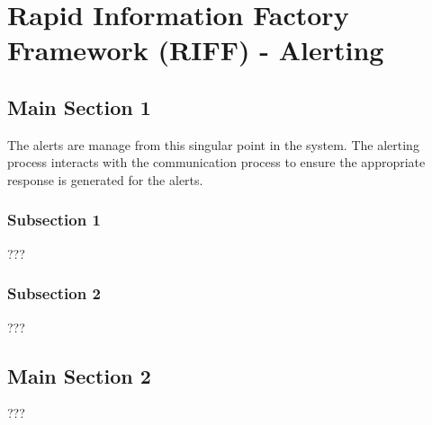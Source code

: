 
\chapter{Rapid Information Factory Framework (RIFF) - Alerting} %

\label{Chapter23} %



\section{Main Section 1}

The alerts are manage from this singular point in the system. The alerting process interacts with the communication process to ensure the appropriate response is generated for the alerts.

\subsection{Subsection 1}

???


\subsection{Subsection 2}

???


\section{Main Section 2}

???
